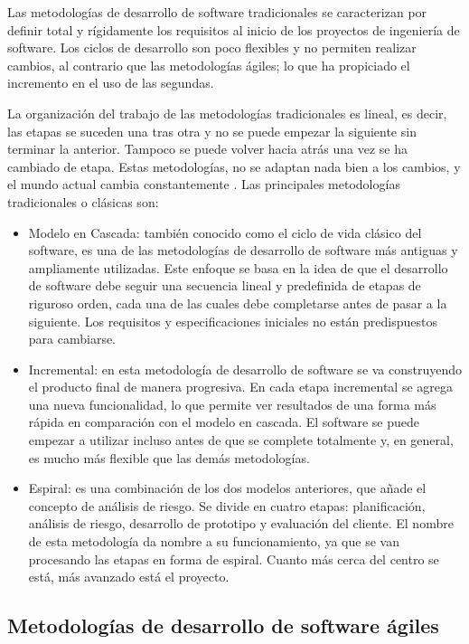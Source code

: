 Las metodologías de desarrollo de software tradicionales se caracterizan por 
definir total y rígidamente los requisitos al inicio de los proyectos de ingeniería 
de software. Los ciclos de desarrollo son poco flexibles y no permiten realizar cambios, 
al contrario que las metodologías ágiles; lo que ha propiciado el incremento en el uso de 
las segundas.
    
La organización del trabajo de las metodologías tradicionales es lineal, es decir, 
las etapas se suceden una tras otra y no se puede empezar la siguiente sin terminar 
la anterior. Tampoco se puede volver hacia atrás una vez se ha cambiado de etapa. 
Estas metodologías, no se adaptan nada bien a los cambios, y el mundo actual cambia 
constantemente \citep{awad2005agile_v_traditional}. Las principales metodologías 
tradicionales o clásicas son:
    
\begin{itemize}
	\item Modelo en Cascada: también conocido como el ciclo de vida clásico del software, es una de las metodologías de desarrollo de software más antiguas y ampliamente utilizadas. Este enfoque se basa en la idea de que el desarrollo de software debe seguir una secuencia lineal y predefinida de etapas de riguroso orden, cada una de las cuales debe completarse antes de pasar a la siguiente. Los requisitos y especificaciones iniciales no están predispuestos para cambiarse.
	\item Incremental: en esta metodología de desarrollo de software se va construyendo el producto final de manera progresiva. En cada etapa incremental se agrega una nueva funcionalidad, lo que permite ver resultados de una forma más rápida en comparación con el modelo en cascada. El software se puede empezar a utilizar incluso antes de que se complete totalmente y, en general, es mucho más flexible que las demás metodologías.
	\item Espiral: es una combinación de los dos modelos anteriores, que añade el concepto de análisis de riesgo. Se divide en cuatro etapas: planificación, análisis de riesgo, desarrollo de prototipo y evaluación del cliente. El nombre de esta metodología da nombre a su funcionamiento, ya que se van procesando las etapas en forma de espiral. Cuanto más cerca del centro se está, más avanzado está el proyecto.
\end{itemize}
    
\subsection{Metodologías de desarrollo de software ágiles}
    

